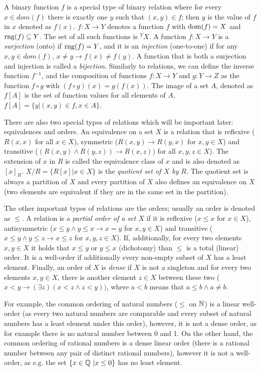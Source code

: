 A binary function $f$ is a special type of binary relation where for every $x \in dom(f)$ there is exactly one $y$ such that $(x,y) \in f$; then $y$ is the value of $f$ in $x$ denoted as $f(x)$. $f: X \to Y$ denotes a function $f$ with $\operatorname{dom}(f) = X$ and $\operatorname{rng}(f) \subseteq Y$. The set of all such functions is $^YX$. A function $f: X \to Y$ is a \emph{surjection} (onto) if $\operatorname{rng}(f)=Y$, and it is an \emph{injection} (one-to-one) if for any $x,y \in dom(f)$, $x \neq y \to f(x) \neq f(y)$. A function that is both a surjection and injection is called a \emph{bijection}. Similarly to relations, we can define the inverse function $f^{-1}$, and the composition of functions $f:X\to Y$ and $g:Y\to Z$ as the function $f \circ g$ with $(f \circ g)(x) = g(f(x))$. The image of a set $A$, denoted as $f[A]$ is the set of function values for all elements of $A$, $f[A] = \{y |(x,y) \in f, x \in A\}$.

There are also two special types of relations which will be important later: equivalences and orders. An equivalence on a set $X$ is a relation that is reflexive ($R(x,x)$ for all $x\in X$), symmetric ($R(x,y) \to R(y,x)$ for $x,y \in X$) and transitive ($(R(x,y) \land R(y,z)) \to R(x,z))$ for all $x,y,z \in X$). The extension of $x$ in $R$ is called the equivalence class of $x$ and is also denoted as $[x]_R$. $X/R = \{R[x] | x \in X\}$ is the \emph{quotient set of $X$ by $R$}. The quotient set is always a partition of $X$ and every partition of $X$ also defines an equivalence on $X$ (two elements are equivalent if they are in the same set in the partition). 

The other important types of relations are the orders; usually an order is denoted as $\leq$. A relation is a \emph{partial order of a set $X$} if it is reflexive ($x \leq x$ for $x \in X$), antisymmetric ($x \leq y \land y \leq x \to x = y$ for $x,y\in X$) and transitive ($x \leq y \land y \leq z \to x \leq z$ for $x,y,z \in X$). If, additionally, for every two elements $x,y \in X$ it holds that $x \leq y$ or $y \leq x$ (dichotomy) than $\leq$ is a total (linear) order. It is a well-order if additionally every non-empty subset of $X$ has a least element. Finally, an order of $X$ is \emph{dense} if $X$ is not a singleton and for every two elements $x,y \in X$, there is another element $z \in X$ between these two ($x < y \to (\exists z) (x < z \land z < y))$, where $a < b$ means that $a \leq b \land a \neq b$. 

For example, the common ordering of natural numbers ($\leq$ on $\mathbb{N}$) is a linear well-order (as every two natural numbers are comparable and every subset of natural numbers has a least element under this order), however, it is not a dense order, as for example there is no natural number between 0 and 1. On the other hand, the common ordering of rational numbers is a dense linear order (there is a rational number between any pair of distinct rational numbers), however it is not a well-order, as e.g. the set $\{x \in \mathbb{Q}\ | x \leq 0\}$ has no least element.


